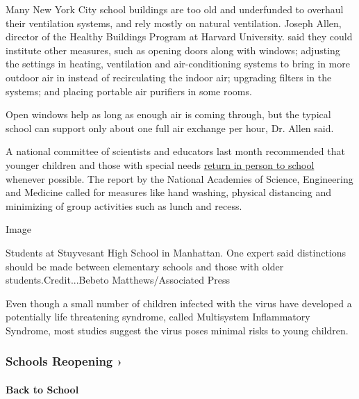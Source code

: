 Many New York City school buildings are too old and underfunded to
overhaul their ventilation systems, and rely mostly on natural
ventilation. Joseph Allen, director of the Healthy Buildings Program at
Harvard University. said they could institute other measures, such as
opening doors along with windows; adjusting the settings in heating,
ventilation and air-conditioning systems to bring in more outdoor air in
instead of recirculating the indoor air; upgrading filters in the
systems; and placing portable air purifiers in some rooms.

Open windows help as long as enough air is coming through, but the
typical school can support only about one full air exchange per hour,
Dr. Allen said.

A national committee of scientists and educators last month recommended
that younger children and those with special needs
\href{https://www.nytimes3xbfgragh.onion/2020/07/15/health/coronavirus-schools-reopening.html}{return
in person to school} whenever possible. The report by the National
Academies of Science, Engineering and Medicine called for measures like
hand washing, physical distancing and minimizing of group activities
such as lunch and recess.

Image

Students at Stuyvesant High School in Manhattan. One expert said
distinctions should be made between elementary schools and those with
older students.Credit...Bebeto Matthews/Associated Press

Even though a small number of children infected with the virus have
developed a potentially life threatening syndrome, called Multisystem
Inflammatory Syndrome, most studies suggest the virus poses minimal
risks to young children.

\href{https://www.nytimes3xbfgragh.onion/spotlight/schools-reopening?action=click\&pgtype=Article\&state=default\&region=MAIN_CONTENT_3\&context=storylines_keepup}{}

\hypertarget{schools-reopening-}{%
\subsubsection{Schools Reopening ›}\label{schools-reopening-}}

\hypertarget{back-to-school}{%
\paragraph{Back to School}\label{back-to-school}}

